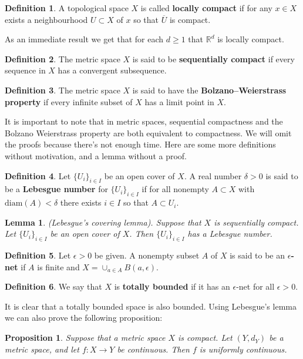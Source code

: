 \documentclass[11pt,a4paper]{article}
\theoremstyle{definition}
\newtheorem{definition}{Definition}[section]
\theoremstyle{plain}
\newtheorem{proposition}[theorem]{Proposition}
\newtheorem{lemma}[theorem]{Lemma}
\newcommand{\R}{\mathbb{R}}
\begin{document}
	\begin{definition}
		A topological space $X$ is called \textbf{locally compact} if for
		any $x \in X$ exists a neighbourhood $U \subset X$ of $x$ so that
		$\overline{U}$ is compact.
	\end{definition}
	As an immediate result we get that for each $d \geq 1$ that $\R^d$
	is locally compact.
	\begin{definition}
		The metric space $X$ is said to be \textbf{sequentially compact} 
		if every sequence in $X$ has a convergent subsequence.
	\end{definition}
	\begin{definition}
		The metric space $X$ is said to have the 
		\textbf{Bolzano–Weierstrass property} if every infinite subset of 
		$X$ has a limit point in $X$.
	\end{definition}
	It is important to note that in metric spaces, sequential compactness and 
	the Bolzano Weierstrass property are both
	equivalent to compactness. We will omit the proofs because there's not
	enough time. Here are some more definitions without
	motivation, and a lemma without a proof.
	\begin{definition}
		Let $\{U_i\}_{i \in I}$ be an open cover of $X$. A real number 
		$\delta > 0$ is said to be a \textbf{Lebesgue number} 
		for $\{U_i\}_{i \in I}$
		if for all nonempty $A \subset X$ with $\text{diam}(A) < \delta$
		there exists $i \in I$ so that $A \subset U_i$.
	\end{definition}
	\begin{lemma}
		(Lebesgue’s covering lemma). Suppose that $X$ is sequentially 
		compact. Let $\{U_i\}_{i \in I}$ be an open cover of $X$. 
		Then $\{U_i\}_{i \in I}$ has a Lebesgue number.
	\end{lemma}
	\begin{definition}
		Let $\epsilon > 0$ be given. A nonempty subset $A$ of $X$ is 
		said to be an \textbf{$\epsilon$-net} if $A$ is finite and 
		$X = \cup_{a \in A}{B(a, \epsilon)}$.
	\end{definition}
	\begin{definition}
		We say that $X$ is \textbf{totally bounded} if it has an 
		$\epsilon$-net for all $\epsilon > 0$.
	\end{definition}
	It is clear that a totally bounded space is also bounded. 
	Using Lebesgue's lemma we can also prove the following proposition:
	\begin{proposition}
		Suppose that a metric space $X$ is compact. Let $(Y, d_Y)$ be a 
		metric space, and let $f \colon X \to Y$ be continuous. Then $f$ is 
		uniformly continuous.	
	\end{proposition}
\end{document}
